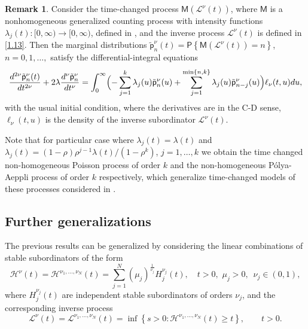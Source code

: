 \documentclass[12pt]{article}
\theoremstyle{definition}
\newtheorem{remark}{Remark}
\theoremstyle{plain}
\newcommand{\Prob}{\mathsf{P}}
\begin{document}
\begin{remark}
Consider  the time-changed process $\mathsf{M}(\mathcal{L}^\nu(t))$, where $\mathsf{M}$ is a nonhomogeneous generalized counting process with intensity functions $\lambda_j(t):[0,\infty)\to[0,\infty)$, defined in \cite{KK2022Arxiv},  and the inverse process $\mathcal{L}^\nu(t)$ is  defined in \eqref{1.13}. 
Then 
     the marginal distributions ${\tilde{\mathsf p}}_n^\nu(t)=\Prob\left\{\mathsf{M}\left(\mathcal{L}^\nu(t)\right)=n\right\}$, $n=0,1,\dots,$ satisfy the differential-integral equations
    \begin{equation*}
    \frac{d^{2\nu} {\tilde{\mathsf p}}_n^\nu(t)}{dt^{2\nu}} + 2\lambda \frac{d^\nu {\tilde{\mathsf p}}_n^\nu}{dt^\nu}=\int_{0}^{\infty}\Bigl(-\sum_{j=1}^{k}\lambda_j(u){\tilde{\mathsf p}}^\nu_n(u)+ \sum_{j=1}^{\min\{n,k\}}\lambda_j(u){\tilde{\mathsf p}}^\nu_{n-j}(u)\Bigr)\ell_\nu(t,u)du,
    \end{equation*}
    with the usual initial condition,
        where the derivatives are in the  C-D sense,  $\ell_\nu(t,u)$ is the density of the inverse subordinator $\mathcal{L}^\nu(t)$.
        
        Note that for particular case where $\lambda_j(t)=\lambda(t)$ and $\lambda_j(t)=(1-\rho)\rho^{j-1}\lambda(t)/(1-\rho^k)$, $j=1,\ldots, k$ we obtain the time changed non-homogeneous Poisson process of order $k$ and the non-homogeneous P\'olya-Aeppli process of order $k$ respectively, which generalize time-changed models of these processes considered in \cite{KLS}.

\end{remark}



\subsection{Further generalizations}

The previous results can be generalized by considering the linear combinations of stable subordinators of the form 
\begin{equation}\label{genHnu}
		\mathcal{H}^\nu(t)=\mathcal{H}^{\nu_1,\ldots,\nu_N}(t) = \sum_{j=1}^N (\mu_j)^{\frac{1}{\nu_j}}H_j^{\nu_j}(t), \quad t > 0,\,\,\mu_j>0,\,\,\,  \nu_j \in (0,1),
	\end{equation}
	where  $H_j^{\nu_j}(t)$  are independent stable subordinators of orders ${\nu_j}$, and  the corresponding  inverse  process 
	\begin{equation}\label{genLnu}
	\mathcal{L}^\nu(t)=\mathcal{L}^{\nu_1,\ldots,\nu_N}(t)  = \inf \left\{ s > 0 : \mathcal{H}^{\nu_1,\ldots,\nu_N}(t)  \ge t \right\}, \qquad t > 0.
	\end{equation}
	
\end{document}
